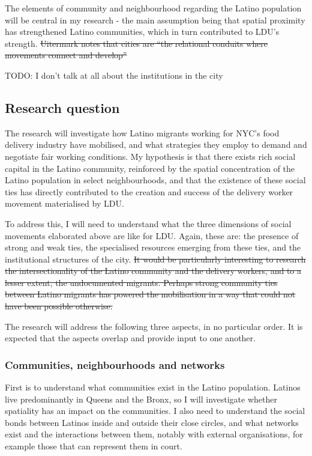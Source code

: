\documentclass{article}
\begin{document}
The elements of community and neighbourhood regarding the Latino population will be central in my research - the main assumption being that spatial proximity has strengthened Latino communities, which in turn contributed to LDU’s strength. 
\sout{Uitermark notes that cities are ``the relational conduits where movements connect and develop''} %

TODO: I don't talk at all about the institutions in the city

\subsection{Research question}

The research will investigate how Latino migrants working for NYC’s food delivery industry have mobilised, and what strategies they employ to demand and negotiate fair working conditions. 
My hypothesis is that there exists rich social capital in the Latino community, reinforced by the spatial concentration of the Latino population in select neighbourhoods, and that the existence of these social ties has directly contributed to the creation and success of the delivery worker movement materialised by LDU.

To address this, I will need to understand what the three dimensions of social movements elaborated above are like for LDU. Again, these are: the presence of strong and weak ties, the specialised resources emerging from these ties, and the institutional structures of the city. 
\sout{It would be particularly interesting to research the intersectionality of the Latino community and the delivery workers, and to a lesser extent, the undocumented migrants. Perhaps strong community ties between Latino migrants has powered the mobilisation in a way that could not have been possible otherwise.}

The research will address the following three aspects, in no particular order. It is expected that the aspects overlap and provide input to one another.

\subsubsection{Communities, neighbourhoods and networks}

First is to understand what communities exist in the Latino population. Latinos live predominantly in Queens and the Bronx, so I will investigate whether spatiality has an impact on the communities. I also need to understand the social bonds between Latinos inside and outside their close circles, and what networks exist and the interactions between them, notably with external organisations, for example those that can represent them in court.
\end{document}
